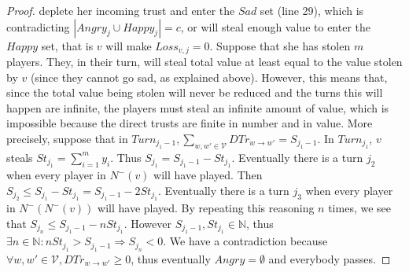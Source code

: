 \documentclass[11pt]{article}
\theoremstyle{definition}
\theoremstyle{corollary}
\theoremstyle{lemma}
\begin{document}
\begin{proof}
       deplete her incoming trust and enter the $Sad$ set (line 29), which is contradicting $|Angry_j \cup Happy_j| = c$,
       or will steal enough value to enter the $Happy$ set, that is $v$ will make $Loss_{v, j} = 0$. Suppose that she has
       stolen $m$ players. They, in their turn, will steal total value at least equal to the value stolen by $v$ (since they
       cannot go sad, as explained above). However, this means that, since the total value being stolen will never be reduced
       and the turns this will happen are infinite, the players must steal an infinite amount of value, which is impossible
       because the direct trusts are finite in number and in value. More precisely, suppose that in $Turn_{j_1-1},
       \sum\limits_{w,w' \in \mathcal{V}}DTr_{w \rightarrow w'} = S_{j_1-1}$. In $Turn_{j_1}$, $v$ steals $St_{j_1} =
       \sum\limits_{i=1}^{m}y_i$. Thus $S_{j_1} = S_{j_1-1} - St_{j_1}$. Eventually there is a turn $j_2$ when every player
       in $N^{-}(v)$ will have played. Then $S_{j_2} \leq S_{j_1} - St_{j_1} = S_{j_1-1} - 2St_{j_1}$. Eventually there is a
       turn $j_3$ when every player in $N^{-}(N^{-}(v))$ will have played. By repeating this reasoning $n$ times, we see that
       $S_{j_n} \leq S_{j_1-1} - nSt_{j_1}$. However $S_{j_1-1}, St_{j_1} \in \mathbb{N}$, thus $\exists n \in \mathbb{N} :
       nSt_{j_1} > S_{j_1-1} \Rightarrow S_{j_n} < 0$. We have a contradiction because $\forall w,w' \in \mathcal{V},
       DTr_{w \rightarrow w'} \geq 0$, thus eventually $Angry = \emptyset$ and everybody passes.
    \end{proof}
\end{document}

